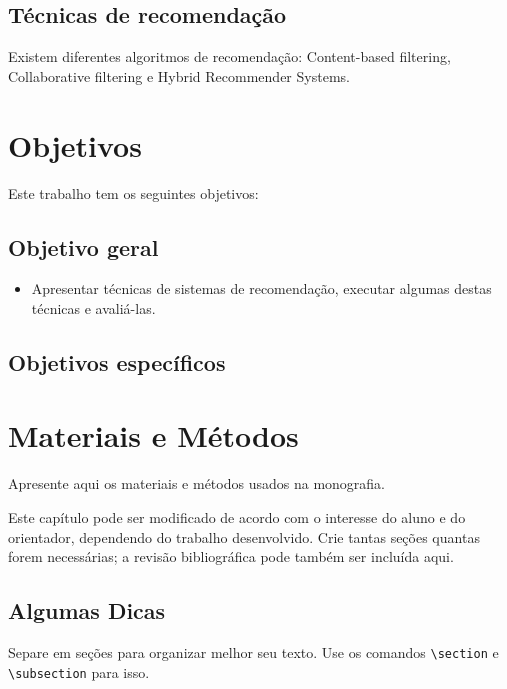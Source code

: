\documentclass[12pt,a4paper,header]{abnt}
\begin{document}
\section{Técnicas de recomendação}

Existem diferentes algoritmos de recomendação: Content-based filtering, Collaborative filtering e Hybrid Recommender Systems\cite{melville2011recommender}.
\chapter{Objetivos}

Este trabalho tem os seguintes objetivos:

\section{Objetivo geral}

\begin{itemize}

\item{Apresentar técnicas de sistemas de recomendação, executar algumas destas técnicas e avaliá-las.}

\end{itemize}

\section{Objetivos específicos}


\chapter{Materiais e Métodos}

Apresente aqui os materiais e métodos usados na monografia. 

Este capítulo pode ser modificado de acordo com o interesse do aluno e do orientador, dependendo do trabalho desenvolvido. Crie tantas seções quantas forem necessárias; a revisão bibliográfica pode também ser incluída aqui.


\section{Algumas Dicas}

Separe em seções para organizar melhor seu texto. Use os comandos \verb|\section| e \verb|\subsection| para isso. 
\end{document}
